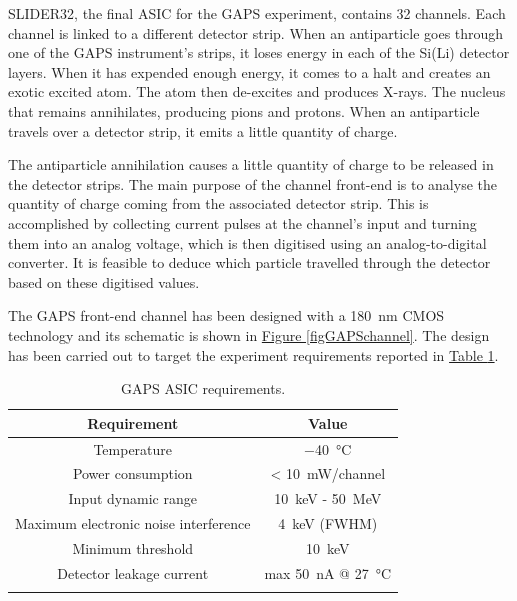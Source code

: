 SLIDER32, the final ASIC for the GAPS experiment, contains 32 channels. Each channel is linked to a different detector strip. When an antiparticle goes through one of the GAPS instrument's strips, it loses energy in each of the Si(Li) detector layers. When it has expended enough energy, it comes to a halt and creates an exotic excited atom. The atom then de-excites and produces X-rays. The nucleus that remains annihilates, producing pions and protons. When an antiparticle travels over a detector strip, it emits a little quantity of charge.

\par
The antiparticle annihilation causes a little quantity of charge to be released in the detector strips. The main purpose of the channel front-end is to analyse the quantity of charge coming from the associated detector strip. This is accomplished by collecting current pulses at the channel's input and turning them into an analog voltage, which is then digitised using an analog-to-digital converter. It is feasible to deduce which particle travelled through the detector based on these digitised values.

\par
The GAPS front-end channel has been designed with a \SI{180}{\nano\meter} CMOS technology and its schematic is shown in \hyperref[figGAPSchannel]{Figure \ref{figGAPSchannel}}. The design has been carried out to target the experiment requirements reported in \hyperref[tabGAPSrequirements]{Table \ref{tabGAPSrequirements}}.

\begin{table}[ht]
    \centering
    \begin{tabular}{c c} 
         \Xhline{2\arrayrulewidth}
         Requirement & Value \T\B \\
         \hline
         Temperature & \SI{-40}{\celsius} \T\B \\
         Power consumption & < \SI{10}{\milli\watt}/channel \T\B \\
         Input dynamic range & \SI{10}{\kilo\electronvolt} - \SI{50}{\mega\electronvolt} \T\B \\
         Maximum electronic noise interference & \SI{4}{\kilo\electronvolt} (FWHM) \T\B \\
         Minimum threshold & \SI{10}{\kilo\electronvolt} \T\B \\
         Detector leakage current & max \SI{50}{\nano\ampere} @ \SI{27}{\celsius} \T\B \\
         \Xhline{2\arrayrulewidth}
    \end{tabular}
    \caption{GAPS ASIC requirements.}
    \label{tabGAPSrequirements}
\end{table}

